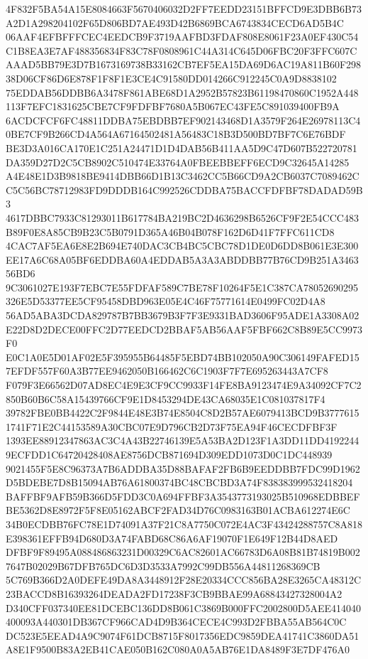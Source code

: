 \documentclass[UTF8,fontset=fandol,zihao=-4,a4paper]{ctexart}
\begin{document}
{{4F832F5BA54A15E8084663F5670406032D2FF7EEDD23151BFFCD9E3DBB6B73A2D1A298204102F65D806BD7AE493D42B6869BCA6743834CECD6AD5B4C
06AAF4EFBFFFCEC4EEDCB9F3719AAFBD3FDAF808E8061F23A0EF430C54C1B8EA3E7AF488356834F83C78F0808961C44A314C645D06FBC20F3FFC607C
AAAD5BB79E3D7B1673169738B33162CB7EF5EA15DA69D6AC19A811B60F29838D06CF86D6E878F1F8F1E3CE4C91580DD014266C912245C0A9D8838102
75EDDAB56DDBB6A3478F861ABE68D1A2952B57823B61198470860C1952A448113F7EFC1831625CBE7CF9FDFBF7680A5B067EC43FE5C891039400FB9A
6ACDCFCF6FC48811DDBA75EBDBB7EF902143468D1A3579F264E26978113C40BE7CF9B266CD4A564A67164502481A56483C18B3D500BD7BF7C6E76BDF
BE3D3A016CA170E1C251A24471D1D4DAB56B411AA5D9C47D607B522720781DA359D27D2C5CB8902C510474E33764A0FBEEBBEFF6ECD9C32645A14285
A4E48E1D3B9818BE9414DBB66D1B13C3462CC5B66CD9A2CB6037C7089462CC5C56BC78712983FD9DDDB164C992526CDDBA75BACCFDFBF78DADAD59B3
4617DBBC7933C81293011B617784BA219BC2D4636298B6526CF9F2E54CCC483B89F0E8A85CB9B23C5B0791D365A46B04B078F162D6D41F7FFC611CD8
4CAC7AF5EA6E8E2B694E740DAC3CB4BC5CBC78D1DE0D6DD8B061E3E300EE17A6C68A05BF6EDDBA60A4EDDAB5A3A3ABDDBB77B76CD9B251A346356BD6
9C3061027E193F7EBC7E55FDFAF589C7BE78F10264F5E1C387CA78052690295326E5D53377EE5CF95458DBD963E05E4C46F75771614E0499FC02D4A8
56AD5ABA3DCDA829787B7BB3679B3F7F3E9331BAD3606F95ADE1A3308A02E22D8D2DECE00FFC2D77EEDCD2BBAF5AB56AAF5FBF662C8B89E5CC9973F0
E0C1A0E5D01AF02E5F395955B64485F5EBD74BB102050A90C306149FAFED157EFDF557F60A3B77EE9462050B166462C6C1903F7F7E695263443A7CF8
F079F3E66562D07AD8EC4E9E3CF9CC9933F14FE8BA9123474E9A34092CF7C2850B60B6C58A15439766CF9E1D8453294DE43CA68035E1C081037817F4
39782FBE0BB4422C2F9844E48E3B74E8504C8D2B57AE6079413BCD9B37776151741F71E2C44153589A30CBC07E9D796CB2D73F75EA94F46CECDFBF3F
1393EE88912347863AC3C4A43B22746139E5A53BA2D123F1A3DD11DD41922449ECFDD1C64720428408AE8756DCB871694D309EDD1073D0C1DC448939
9021455F5E8C96373A7B6ADDBA35D88BAFAF2FB6B9EEDDBB7FDC99D1962D5BDEBE7D8B15094AB76A61800374BC48CBCBD3A74F838383999532418204
BAFFBF9AFB59B366D5FDD3C0A694FFBF3A3543773193025B510968EDBBEFBE5362D8E8972F5F8E05162ABCF2FAD34D76C0983163B01ACBA612274E6C
34B0ECDBB76FC78E1D74091A37F21C8A7750C072E4AC3F43424288757C8A818E398361EFFB94D680D3A74FABD68C86A6AF19070F1E649F12B44D8AED
DFBF9F89495A088486863231D00329C6AC82601AC66783D6A08B81B74819B0027647B02029B67DFB765DC6D3D3533A7992C99DB556A44811268369CB
5C769B366D2A0DEFE49DA8A3448912F28E20334CCC856BA28E3265CA48312C23BACCD8B16393264DEADA2FD17238F3CB9BBAE99A68843427328004A2
D340CFF037340EE81DCEBC136DD8B061C3869B000FFC2002800D5AEE414040400093A440301DB367CF966CAD4D9B364CECE4C993D2FBBA55AB564C0C
DC523E5EEAD4A9C9074F61DCB8715F8017356EDC9859DEA41741C3860DA51A8E1F9500B83A2EB41CAE050B162C080A0A5AB76E1DA8489F3E7DF476A0
}}
\end{document}
